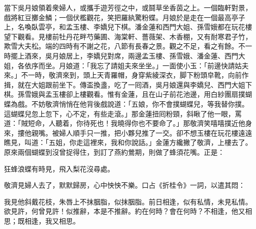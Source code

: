 當下吳月娘領着衆婦人，或攜手遊芳徑之中，或鬪草坐香茵之上。一個臨軒對景，戲將紅豆擲金鱗；一個伏檻觀花，笑把羅紈驚粉蝶。{}月娘於是走在一個最高亭子上，名喚臥雲亭，和孟玉樓、李嬌兒下棋。潘金蓮和西門大姐、孫雪娥都在玩花樓望下觀看。見樓前牡丹花畔芍藥圃、海棠軒、薔薇架、木香棚，又有耐寒君子竹，欺雪大夫松。端的四時有不謝之花，八節有長春之景。觀之不足，看之有餘。不一時擺上酒來，吳月娘居上，李嬌兒對席，兩邊孟玉樓、孫雪娥、潘金蓮、西門大姐，各依序而坐。月娘道：「我忘了請姐夫來坐坐。」{}一面使小玉：「前邊快請姑夫來。」不一時，敬濟來到，頭上天青羅帽，身穿紫綾深衣，脚下粉頭皁靴，向前作揖，就在大姐跟前坐下。傳盃換盞，吃了一囘酒，吳月娘還與李嬌兒、西門大姐下棋。孫雪娥與孟玉樓卻上樓觀看。惟有金蓮，且在山子前花池邊，用白紗團扇撲蝴蝶為戲。不妨敬濟悄悄在他背後戲說道：「五娘，你不會撲蝴蝶兒，等我替你撲。這蝴蝶兒忽上忽下，心不定，有些走滾。」{}那金蓮扭囘粉頸，斜瞅了他一眼，罵道：「賊短命，人聽着，你待死也！我曉得你也不要命了。」{}那敬濟笑嘻嘻撲近他身來，摟他親嘴。被婦人順手只一推，把小夥兒推了一交。卻不想玉樓在玩花樓遠遠瞧見，叫道：「五姐，你走這裡來，我和你說話。」金蓮方纔撇了敬濟，上樓去了。原來兩個蝴蝶到沒曾捉得住，到訂了燕約鶯期，則做了蜂須花嘴。正是：

\begin{myquote}
狂蜂浪蝶有時見，飛入梨花沒尋處。
\end{myquote}

敬濟見婦人去了，默默歸房，心中怏怏不樂。口占《折桂令》一詞，以遣其悶：

\begin{myquote}
我見他斜戴花枝，朱唇上不抹胭脂，似抹胭脂。前日相逢，似有私情，未見私情。欲見許，何曾見許！似推辭，本是不推辭。約在何時？會在何時？不相逢，他又相思；既相逢，我又相思。
\end{myquote}

